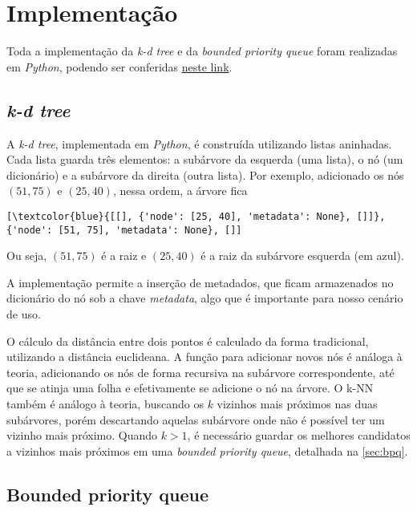 \section{Implementação}

    Toda a implementação da \textit{k-d tree} e da \textit{bounded priority queue} foram realizadas em \textit{Python}, podendo ser conferidas \href{https://github.com/lucasresck/data-structures-algorithms/blob/main/trees/scripts/k_d_tree.py}{neste link}.

    \subsection{\textit{k-d tree}}

        A \textit{k-d tree}, implementada em \textit{Python}, é construída utilizando listas aninhadas. Cada lista guarda três elementos: a subárvore da esquerda (uma lista), o nó (um dicionário) e a subárvore da direita (outra lista). Por exemplo, adicionado os nós $(51, 75)$ e $(25, 40)$, nessa ordem, a árvore fica        
        \begin{Verbatim}[commandchars=\\\{\}]
[\textcolor{blue}{[[], {'node': [25, 40], 'metadata': None}, []]}, {'node': [51, 75], 'metadata': None}, []]
        \end{Verbatim}
        Ou seja, $(51, 75)$ é a raiz e $(25, 40)$ é a raiz da subárvore esquerda (em azul).

        A implementação permite a inserção de metadados, que ficam armazenados no dicionário do nó sob a chave \textit{metadata}, algo que é importante para nosso cenário de uso.
        
        O cálculo da distância entre dois pontos é calculado da forma tradicional, utilizando a distância euclideana. 
        A função para adicionar novos nós é análoga à teoria, adicionando os nós de forma recursiva na subárvore correspondente, até que se atinja uma folha e efetivamente se adicione o nó na árvore. O k-NN também é análogo à teoria, buscando os $k$ vizinhos mais próximos nas duas subárvores, porém descartando aquelas subárvore onde não é possível ter um vizinho mais próximo. Quando $k > 1$, é necessário guardar os melhores candidatos a vizinhos mais próximos em uma \textit{bounded priority queue}, detalhada na \autoref{sec:bpq}.

    \subsection{Bounded priority queue}
        \label{sec:bpq}

